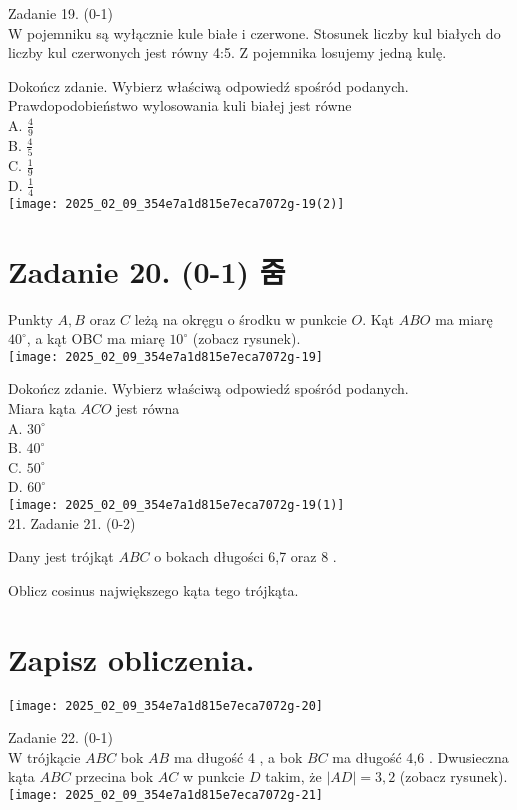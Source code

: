 \documentclass[10pt]{article}
\begin{document}
Zadanie 19. (0-1)\\
W pojemniku są wyłącznie kule białe i czerwone. Stosunek liczby kul białych do liczby kul czerwonych jest równy 4:5. Z pojemnika losujemy jedną kulę.

Dokończ zdanie. Wybierz właściwą odpowiedź spośród podanych.\\
Prawdopodobieństwo wylosowania kuli białej jest równe\\
A. \(\frac{4}{9}\)\\
B. \(\frac{4}{5}\)\\
C. \(\frac{1}{9}\)\\
D. \(\frac{1}{4}\)\\
\texttt{[image: 2025\_02\_09\_354e7a1d815e7eca7072g-19(2)]}

\section*{Zadanie 20. (0-1) 줌}
Punkty \(A, B\) oraz \(C\) leżą na okręgu o środku w punkcie \(O\). Kąt \(A B O\) ma miarę \(40^{\circ}\), a kąt OBC ma miarę \(10^{\circ}\) (zobacz rysunek).\\
\texttt{[image: 2025\_02\_09\_354e7a1d815e7eca7072g-19]}

Dokończ zdanie. Wybierz właściwą odpowiedź spośród podanych.\\
Miara kąta \(A C O\) jest równa\\
A. \(30^{\circ}\)\\
B. \(40^{\circ}\)\\
C. \(50^{\circ}\)\\
D. \(60^{\circ}\)\\
\texttt{[image: 2025\_02\_09\_354e7a1d815e7eca7072g-19(1)]}\\
21. Zadanie 21. (0-2)

Dany jest trójkąt \(A B C\) o bokach długości 6,7 oraz 8 .

Oblicz cosinus największego kąta tego trójkąta.

\section*{Zapisz obliczenia.}
\begin{center}
\texttt{[image: 2025\_02\_09\_354e7a1d815e7eca7072g-20]}
\end{center}

Zadanie 22. (0-1)\\
W trójkącie \(A B C\) bok \(A B\) ma długość 4 , a bok \(B C\) ma długość 4,6 . Dwusieczna kąta \(A B C\) przecina bok \(A C\) w punkcie \(D\) takim, że \(|A D|=3,2\) (zobacz rysunek).\\
\texttt{[image: 2025\_02\_09\_354e7a1d815e7eca7072g-21]}
\end{document}

